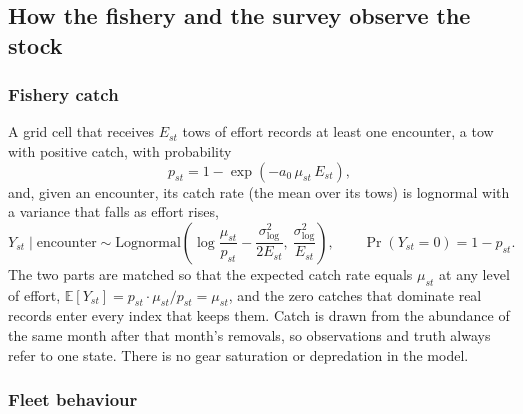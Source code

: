 \documentclass[11pt,a4paper]{article}
\newcommand{\vt}[1]{\text{#1}}
\begin{document}
\subsection{How the fishery and the survey observe the stock}

\subsubsection{Fishery catch}

A grid cell that receives $E_{st}$ tows of effort records at least one encounter, a tow with positive catch, with probability
\begin{equation}
p_{st} = 1-\exp(-a_0\,\mu_{st}\,E_{st}),
\label{eq:encounter}
\end{equation}
and, given an encounter, its catch rate (the mean over its tows) is lognormal with a variance that falls as effort rises,
\begin{equation}
Y_{st}\mid\vt{encounter} \sim \vt{Lognormal}\!\left(\log\frac{\mu_{st}}{p_{st}} - \frac{\sigma^2_{\log}}{2E_{st}},\ \frac{\sigma^2_{\log}}{E_{st}}\right), \qquad \Pr(Y_{st}=0) = 1-p_{st}.
\label{eq:catch}
\end{equation}
The two parts are matched so that the expected catch rate equals $\mu_{st}$ at any level of effort, $\mathbb{E}[Y_{st}] = p_{st}\cdot\mu_{st}/p_{st} = \mu_{st}$, and the zero catches that dominate real records enter every index that keeps them. Catch is drawn from the abundance of the same month after that month's removals, so observations and truth always refer to one state. There is no gear saturation or depredation in the model.

\subsubsection{Fleet behaviour}
\end{document}
